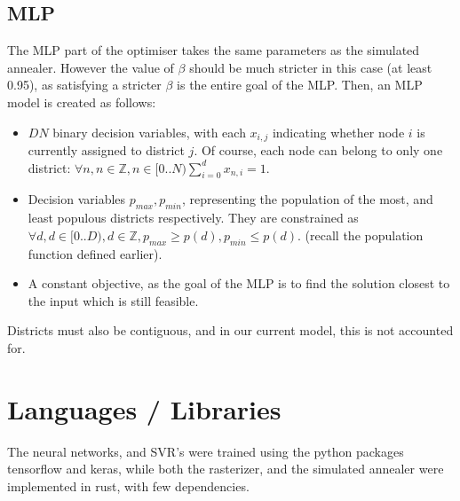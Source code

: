\documentclass{article}
\begin{document}
\subsection{MLP}
The MLP part of the optimiser takes the same parameters as the simulated annealer. However the value of $\beta$ should be much stricter in this case (at least 0.95), as satisfying a stricter $\beta$ is the entire goal of the MLP. Then, an MLP model is created as follows:
\begin{itemize}
    \item $DN$ binary decision variables, with each $x_{i,j}$ indicating whether node $i$ is currently assigned to district $j$. Of course, each node can belong to only one district: $\forall n, n\in\mathbb{Z}, n\in[0..N)\sum_{i=0}^dx_{n,i}=1$.
    \item Decision variables $p_{max}, p_{min}$, representing the population of the most, and least populous districts respectively. They are constrained as $\forall d, d\in[0..D), d\in\mathbb{Z}, p_{max}\geq p(d), p_{min}\leq p(d)$. (recall the population function defined earlier).
    \item A constant objective, as the goal of the MLP is to find the solution closest to the input which is still feasible.
\end{itemize}

Districts must also be contiguous, and in our current model, this is not accounted for.

\section{Languages / Libraries}
The neural networks, and SVR's were trained using the python packages tensorflow and keras, while both the rasterizer, and the simulated annealer were implemented in rust, with few dependencies.
\end{document}
